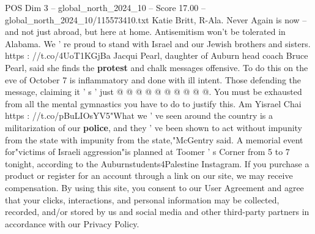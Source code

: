 \begin{textsample}{POS Dim 3 – global\_north\_2024\_10 – Score 17.00 – global\_north\_2024\_10/115573410.txt}
Katie Britt, R-Ala.
Never Again is now -- and not just abroad, but here at home.
Antisemitism won't be tolerated in Alabama.
We ' re proud to stand with Israel and our Jewish brothers and sisters. https : //t.co/4UoT1KGjBa Jacqui Pearl, daughter of Auburn head coach Bruce Pearl, said she finds the \textbf{protest} and chalk messages offensive.
To do this on the eve of October 7 is inflammatory and done with ill intent.
Those defending the message, claiming it ' s ' just @ @ @ @ @ @ @ @ @ @.
You must be exhausted from all the mental gymnastics you have to do to justify this.
Am Yisrael Chai https : //t.co/pBuLIOsYV5"What we ' ve seen around the country is a militarization of our \textbf{police}, and they ' ve been shown to act without impunity from the state with impunity from the state,"McGentry said.
A memorial event for"victims of Israeli aggression"is planned at Toomer ' s Corner from 5 to 7 tonight, according to the Auburnstudents4Palestine Instagram.
If you purchase a product or register for an account through a link on our site, we may receive compensation.
By using this site, you consent to our User Agreement and agree that your clicks, interactions, and personal information may be collected, recorded, and/or stored by us and social media and other third-party partners in accordance with our Privacy Policy.

\end{textsample}
